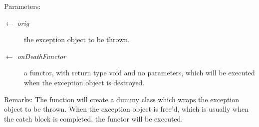 \begin{Desc}
\item[Parameters:]
\begin{description}
\item[\mbox{$\leftarrow$} {\em orig}]the exception object to be thrown. \item[\mbox{$\leftarrow$} {\em on\-Death\-Functor}]a functor, with return type void and no parameters, which will be executed when the exception object is destroyed. \end{description}
\end{Desc}
\begin{Desc}
\item[Remarks:]The function will create a dummy class which wraps the exception object to be thrown. When the exception object is free'd, which is usually when the catch block is completed, the functor will be executed. \end{Desc}
